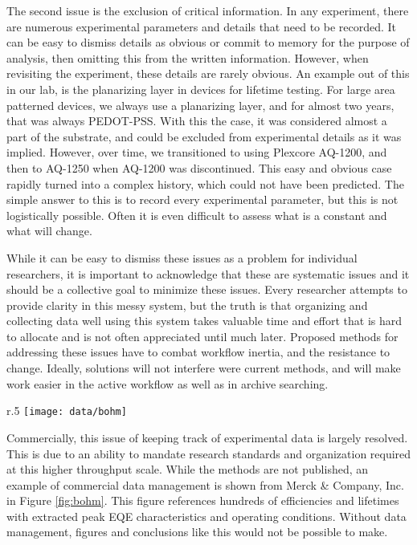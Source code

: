 \documentclass[../thesis.tex]{subfiles}
\begin{document}
The second issue is the exclusion of critical information.  
In any experiment, there are numerous experimental parameters and details that need to be recorded. 
It can be easy to dismiss details as obvious or commit to memory for the purpose of analysis, then omitting this from the written information.
However, when revisiting the experiment, these details are rarely obvious.
An example out of this in our lab, is the planarizing layer in devices for lifetime testing.
For large area patterned devices, we always use a planarizing layer, and for almost two years, that was always PEDOT-PSS.
With this the case, it was considered almost a part of the substrate, and could be excluded from experimental details as it was implied.
However, over time, we transitioned to using Plexcore AQ-1200, and then to AQ-1250 when AQ-1200 was discontinued.
This easy and obvious case rapidly turned into a complex history, which could not have been predicted.
The simple answer to this is to record every experimental parameter, but this is not logistically possible.
Often it is even difficult to assess what is a constant and what will change.

While it can be easy to dismiss these issues as a problem for individual researchers, it is important to acknowledge that these are systematic issues and it should be a collective goal to minimize these issues.
Every researcher attempts to provide clarity in this messy system, but the truth is that organizing and collecting data well using this system takes valuable time and effort that is hard to allocate and is not often appreciated until much later.
Proposed methods for addressing these issues have to combat workflow inertia, and the resistance to change.
Ideally, solutions will not interfere were current methods, and will make work easier in the active workflow as well as in archive searching.

\begin{wrapfigure}{r}{.5\textwidth}
\centering
\texttt{[image: data/bohm]}
\caption{Dependence of EQE (red) and lifetime (black) on the driving voltage for various ETL configurations, sharing same HTL and EML. Reproduced from \textcite{Bohm2011}.}
\label{fig:bohm}
\end{wrapfigure}

Commercially, this issue of keeping track of experimental data is largely resolved.
This is due to an ability to mandate research standards and organization required at this higher throughput scale.
While the methods are not published, an example of commercial data management is shown from Merck \& Company, Inc. in Figure \ref{fig:bohm}.
This figure references hundreds of efficiencies and lifetimes with extracted peak EQE characteristics and operating conditions.
Without data management, figures and conclusions like this would not be possible to make.
\end{document}
